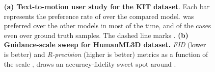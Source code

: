 \begin{table*}[ht]
\centering

\caption{\textbf{Quantitative results on the KIT test set.} }
\label{tab:kit}
\end{table*}


\begin{figure}\centering
    \qquad
    \caption{\textbf{(a) Text-to-motion user study for the KIT dataset}. Each bar represents the preference rate of \ourmethod{} over the compared model. \ourmethod{} was preferred over the other models in most of the time, and  of the cases even over ground truth samples. The dashed line marks . \textbf{(b) Guidance-scale sweep for HumanML3D dataset.} \textit{FID} (lower is better) and \textit{R-precision} (higher is better) metrics as a function of the scale , draws an accuracy-fidelity sweet spot around .}
\vspace{-10pt}
    \label{fig:user_study_and_sweep}
\end{figure}



